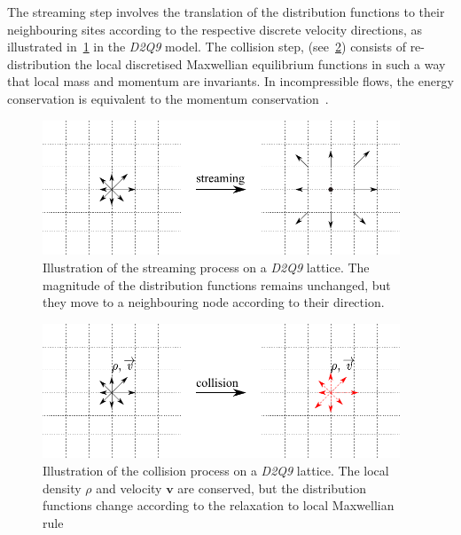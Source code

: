 The streaming step involves the translation of the distribution 
functions to their neighbouring sites according to the 
respective discrete velocity directions, as illustrated 
in~\cref{fig:stream} in the \textit{D2Q9} model. The collision 
step, (see~\cref{fig:collision}) consists of 
re-distribution the local 
discretised Maxwellian equilibrium functions in such a way that 
local mass and momentum are invariants. In incompressible 
flows, the energy conservation is equivalent to the momentum 
conservation~\citep{He1997}.

\begin{figure}[htbp]
	\centering
	\includegraphics[width=0.95\textwidth]{stream}
	\caption[Illustration of the streaming process on a \textit{D2Q9} 
	lattice]{Illustration of the streaming process on a \textit{D2Q9} lattice. 
	The magnitude of the distribution functions remains unchanged, but they 
	move to a neighbouring node according to their direction.}
	\label{fig:stream}
\end{figure}

\begin{figure}[htbp]
	\centering
	\includegraphics[width=0.95\textwidth]{collision}
	\caption[Illustration of the collision process on a \textit{D2Q9} 
	lattice]{Illustration of the collision process on a \textit{D2Q9} lattice. 
	The local density $\rho$ and velocity $\mathbf{v}$ are conserved, but the 
	distribution functions change according to the relaxation to local 
	Maxwellian rule}
	\label{fig:collision}
\end{figure} 


